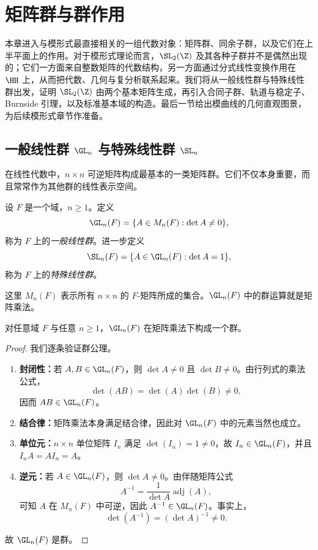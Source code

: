 \chapter{矩阵群与群作用}

本章进入与模形式最直接相关的一组代数对象：矩阵群、同余子群，以及它们在上半平面上的作用。对于模形式理论而言，$\SL_2(\Z)$ 及其各种子群并不是偶然出现的；它们一方面来自整数矩阵的代数结构，另一方面通过分式线性变换作用在 $\HH$ 上，从而把代数、几何与复分析联系起来。我们将从一般线性群与特殊线性群出发，证明 $\SL_2(\Z)$ 由两个基本矩阵生成，再引入合同子群、轨道与稳定子、Burnside 引理，以及标准基本域的构造。最后一节给出模曲线的几何直观图景，为后续模形式章节作准备。

\section{一般线性群 $\GL_n$ 与特殊线性群 $\SL_n$}

在线性代数中，$n\times n$ 可逆矩阵构成最基本的一类矩阵群。它们不仅本身重要，而且常常作为其他群的线性表示空间。

\begin{definition}
设 $F$ 是一个域，$n\ge 1$。定义
\[
\GL_n(F)=\{A\in M_n(F):\det A\ne 0\},
\]
称为 $F$ 上的\emph{一般线性群}。进一步定义
\[
\SL_n(F)=\{A\in \GL_n(F):\det A=1\},
\]
称为 $F$ 上的\emph{特殊线性群}。
\end{definition}

这里 $M_n(F)$ 表示所有 $n\times n$ 的 $F$-矩阵所成的集合。$\GL_n(F)$ 中的群运算就是矩阵乘法。

\begin{proposition}
对任意域 $F$ 与任意 $n\ge 1$，$\GL_n(F)$ 在矩阵乘法下构成一个群。
\end{proposition}

\begin{proof}
我们逐条验证群公理。

\begin{enumerate}
  \item \textbf{封闭性：}若 $A,B\in \GL_n(F)$，则 $\det A\ne 0$ 且 $\det B\ne 0$。由行列式的乘法公式，
  \[
  \det(AB)=\det(A)\det(B)\ne 0,
  \]
  因而 $AB\in \GL_n(F)$。

  \item \textbf{结合律：}矩阵乘法本身满足结合律，因此对 $\GL_n(F)$ 中的元素当然也成立。

  \item \textbf{单位元：}$n\times n$ 单位矩阵 $I_n$ 满足 $\det(I_n)=1\ne 0$，故 $I_n\in \GL_n(F)$，并且 $I_nA=AI_n=A$。

  \item \textbf{逆元：}若 $A\in \GL_n(F)$，则 $\det A\ne 0$。由伴随矩阵公式
  \[
  A^{-1}=\frac{1}{\det A}\operatorname{adj}(A),
  \]
  可知 $A$ 在 $M_n(F)$ 中可逆，因此 $A^{-1}\in \GL_n(F)$。事实上，
  \[
  \det(A^{-1})=(\det A)^{-1}\ne 0.
  \]
\end{enumerate}
故 $\GL_n(F)$ 是群。
\end{proof}

